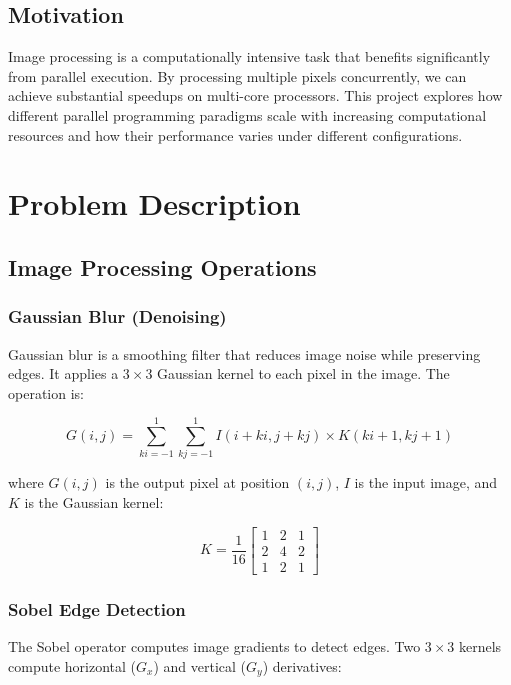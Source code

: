\documentclass[12pt,a4paper]{report}
\begin{document}
\section{Motivation}
Image processing is a computationally intensive task that benefits significantly from parallel execution. By processing multiple pixels concurrently, we can achieve substantial speedups on multi-core processors. This project explores how different parallel programming paradigms scale with increasing computational resources and how their performance varies under different configurations.

\newpage

\chapter{Problem Description}

\section{Image Processing Operations}

\subsection{Gaussian Blur (Denoising)}
Gaussian blur is a smoothing filter that reduces image noise while preserving edges. It applies a $3 \times 3$ Gaussian kernel to each pixel in the image. The operation is:

\begin{equation}
G(i,j) = \sum_{ki=-1}^{1} \sum_{kj=-1}^{1} I(i+ki, j+kj) \times K(ki+1, kj+1)
\end{equation}

where $G(i,j)$ is the output pixel at position $(i,j)$, $I$ is the input image, and $K$ is the Gaussian kernel:

\begin{equation}
K = \frac{1}{16} \begin{bmatrix} 1 & 2 & 1 \\ 2 & 4 & 2 \\ 1 & 2 & 1 \end{bmatrix}
\end{equation}

\subsection{Sobel Edge Detection}
The Sobel operator computes image gradients to detect edges. Two $3 \times 3$ kernels compute horizontal ($G_x$) and vertical ($G_y$) derivatives:
\end{document}

